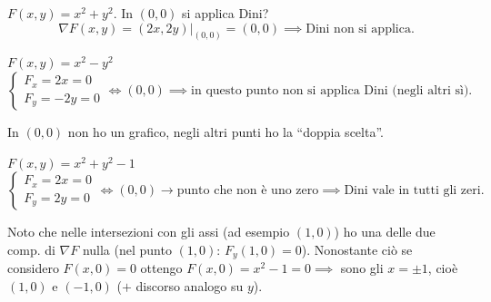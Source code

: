 \begin{esercizio}[ESE 1]
$F(x, y) = x^2 + y^2$. In $(0, 0)$ si applica Dini?
\[
\nabla F(x, y) = (2x, 2y)\big|_{(0, 0)} = (0, 0) \implies \text{Dini non si applica.}
\]
\end{esercizio}

\begin{esercizio}[ESE 2]
$F(x, y) = x^2 - y^2$
\[
\begin{cases}
F_x = 2x = 0 \\
F_y = -2y = 0
\end{cases}
\iff (0, 0) \implies \text{in questo punto non si applica Dini (negli altri sì).}
\]
\begin{center}
\end{center}
In $(0, 0)$ non ho un grafico, negli altri punti ho la ``doppia scelta''.
\end{esercizio}

\begin{esercizio}[ESE 3]
$F(x, y) = x^2 + y^2 - 1$
\[
\begin{cases}
F_x = 2x = 0 \\
F_y = 2y = 0
\end{cases}
\iff (0, 0) \to \text{punto che non è uno zero} \implies \text{Dini vale in tutti gli zeri.}
\]
\begin{center}
\end{center}
Noto che nelle intersezioni con gli assi (ad esempio $(1, 0)$) ho una delle due comp. di $\nabla F$ nulla (nel punto $(1, 0)$: $F_y(1, 0) = 0$). Nonostante ciò se considero $F(x, 0) = 0$ ottengo $F(x, 0) = x^2 - 1 = 0 \implies$ sono gli $x = \pm 1$, cioè $(1, 0)$ e $(-1, 0)$ ($+$ discorso analogo su $y$).
\end{esercizio}

